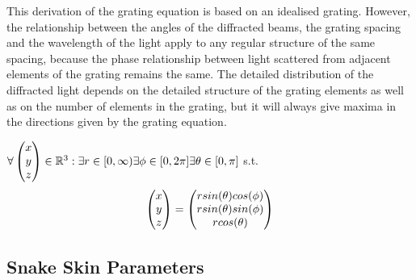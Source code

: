 This derivation of the grating equation is based on an idealised grating. However, the relationship between the angles of the diffracted beams, the grating spacing and the wavelength of the light apply to any regular structure of the same spacing, because the phase relationship between light scattered from adjacent elements of the grating remains the same. The detailed distribution of the diffracted light depends on the detailed structure of the grating elements as well as on the number of elements in the grating, but it will always give maxima in the directions given by the grating equation.


$\forall \colvec[x]{y}{z} \in \mathbb{R}^3 : \exists r \in [0,\infty) \exists \phi \in [0,2\pi] \exists \theta \in [0,\pi] $ s.t.
\begin{equation*}
\colvec[x]{y}{z} = \colvec[r sin(\theta)cos(\phi)]{r sin(\theta)sin(\phi)}{r cos(\theta)}
\end{equation*}

\subsection{Snake Skin Parameters}